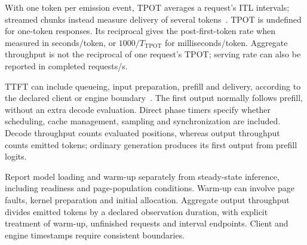 With one token per emission event, TPOT averages a request's ITL
intervals; streamed chunks instead measure delivery of several tokens~\cite{vllm2026}.
TPOT is undefined for one-token responses.  Its reciprocal gives the
post-first-token rate when measured in seconds/token, or
\(1000/T_{\mathrm{TPOT}}\) for milliseconds/token.  Aggregate throughput
is not the reciprocal of one request's TPOT; serving rate can also be
reported in completed requests/s.

TTFT can include queueing, input preparation, prefill and delivery,
according to the declared client or engine boundary~\cite{agrawal2025evaluating}.
The first output normally follows prefill, without an extra decode
evaluation.  Direct phase timers specify whether scheduling, cache
management, sampling and synchronization are included.  Decode throughput
counts evaluated positions, whereas output throughput counts emitted
tokens; ordinary generation produces its first output from prefill logits.

Report model loading and warm-up separately from steady-state inference,
including readiness and page-population conditions.  Warm-up can involve
page faults, kernel preparation and initial allocation.  Aggregate output
throughput divides emitted tokens by a declared observation duration,
with explicit treatment of warm-up, unfinished requests and interval
endpoints.  Client and engine timestamps require consistent boundaries.
